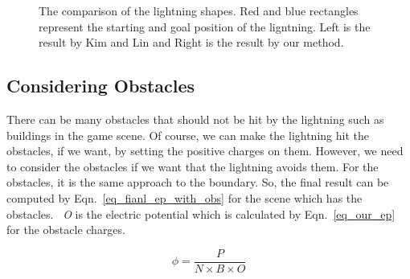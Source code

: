 \begin{figure}[h]
	\centering
	\caption{The comparison of the lightning shapes. Red and blue rectangles represent the starting and goal position of the ligntning. Left is the result by Kim and Lin and Right is the result by our method.}
	\label{fig_comp_lightning_shape}
\end{figure}



\subsection{Considering Obstacles}

There can be many obstacles that should not be hit by the lightning such as buildings in the game scene. Of course, we can make the lightning hit the obstacles, if we want, by setting the positive charges on them. However, we need to consider the obstacles if we want that the lightning avoids them. For the obstacles, it is the same approach to the boundary. So, the final result can be computed by Eqn.~\ref{eq_fianl_ep_with_obs} for the scene which has the obstacles. ~\textit{O} is the electric potential which is calculated by Eqn.~\ref{eq_our_ep} for the obstacle charges.

\begin{equation} \label{eq_fianl_ep_with_obs}
\phi = \frac{P}{N \times B \times O}
\end{equation}

